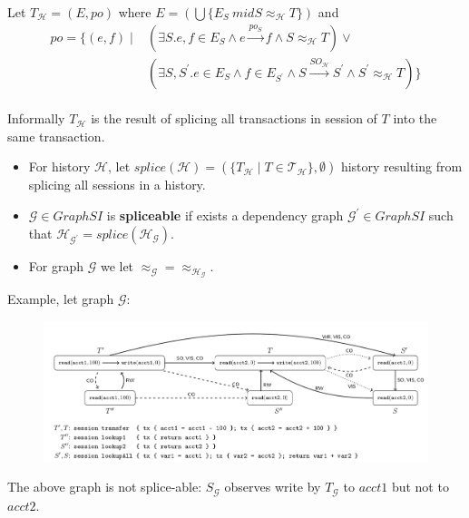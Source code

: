 \documentclass{beamer}
\begin{document}
\begin{frame}
	Let $\boxed{T}_\mathcal{H} = (E, po)$ where 
	$ E = \left(\bigcup \{E_S \ mid S \approx_\mathcal{H} T \} \right) $
	and
	$$
	\begin{aligned}
		po = \{ (e,f) \mid & \left( \exists S . e,f \in E_S \wedge e \xrightarrow{po_S} f \wedge S \approx_\mathcal{H} T \right) \vee \\ 
		                   & \left( \exists S, S^\prime . e\in E_S \wedge f \in E_{S^\prime} \wedge S \xrightarrow{SO_\mathcal{H}} S^\prime \wedge S^\prime \approx_\mathcal{H} T \right) \}
	\end{aligned}
	$$
	\\
	Informally $\boxed{T}_\mathcal{H}$ is the result of splicing all transactions in session of $T$ into the same transaction.
\end{frame}

\begin{frame}
	\begin{itemize}
		\item	For history $\mathcal{H}$, let $splice(\mathcal{H})=\left( \{ \boxed{T}_\mathcal{H} \mid T \in \mathcal{T}_\mathcal{H} \}, \emptyset \right)$ history resulting from splicing all sessions in a history.
		\item $\mathcal{G} \in GraphSI $ is \textbf{spliceable} if exists a dependency graph $ \mathcal{G}^\prime \in GraphSI $ such that $ \mathcal{H}_{\mathcal{G}^\prime} = splice(\mathcal{H}_\mathcal{G})$.
		\item For graph $\mathcal{G}$ we let $\approx_\mathcal{G} = \approx_{\mathcal{H}_\mathcal{G}}$.
	\end{itemize}
\end{frame}

\begin{frame}
Example, let graph $\mathcal{G}$:
\begin{figure}
	\includegraphics[scale=0.28]{fig4}
\end{figure}
The above graph is not splice-able: $\boxed{S}_\mathcal{G}$ observes write by $\boxed{T}_\mathcal{G}$ to $acct1$ but not to $acct2$.
\end{frame}
\end{document}
